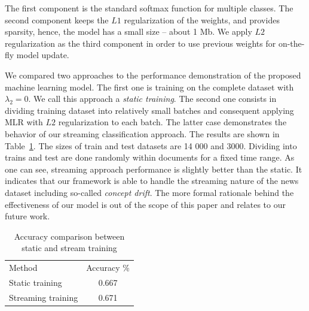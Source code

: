 The first component is the standard softmax function for multiple classes. The second component keeps the $L1$ regularization of the weights, and provides sparsity, hence, the model has a small size -- about 1 Mb. We apply $L2$ regularization as the third component in order to use previous weights for on-the-fly model update.

We compared two approaches to the performance demonstration of the proposed machine learning model. The first one is training on the complete dataset with $\lambda_2 = 0$. We call this approach a {\em static training}. The second one consists in dividing training dataset into relatively small batches and consequent applying MLR with $L2$ regularization to each batch. The latter case demonstrates the behavior of our streaming classification approach. The results are shown in Table~\ref{accuracy}. The sizes of train and test datasets are 14 000 and 3000. Dividing into trains and test are done randomly within documents for a fixed time range. As one can see, streaming approach performance is slightly better than the static. It indicates that our framework is able to handle the streaming nature of the news dataset including so-called {\em concept drift}. The more formal rationale behind the effectiveness of our model is out of the scope of this paper and relates to our future work.

\begin{table}[htbp]
\begin{tabular}{lc}
Method             & Accuracy \% \\
Static training    & 0.667       \\
Streaming training & 0.671         
\end{tabular}
\caption{Accuracy comparison between static and stream training}
\label{accuracy}
\vspace{-7mm}
\end{table}